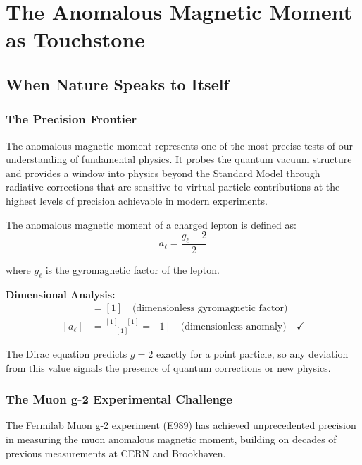\documentclass[12pt,a4paper]{report}
\begin{document}
\chapter{The Anomalous Magnetic Moment as Touchstone}
\label{chap:anomalous_magnetic_moment}

\section{When Nature Speaks to Itself}
\label{sec:nature_speaks}

\subsection{The Precision Frontier}
\label{subsec:precision_frontier}

The anomalous magnetic moment represents one of the most precise tests of our understanding of fundamental physics. It probes the quantum vacuum structure and provides a window into physics beyond the Standard Model through radiative corrections that are sensitive to virtual particle contributions at the highest levels of precision achievable in modern experiments.

The anomalous magnetic moment of a charged lepton is defined as:
\begin{equation}
	a_\ell = \frac{g_\ell - 2}{2}
	\label{eq:anomalous_moment_definition}
\end{equation}

where $g_\ell$ is the gyromagnetic factor of the lepton.

\textbf{Dimensional Analysis:}
\begin{align}
	[g_\ell] &= [1] \quad \text{(dimensionless gyromagnetic factor)} \\
	[a_\ell] &= \frac{[1] - [1]}{[1]} = [1] \quad \text{(dimensionless anomaly)} \quad \checkmark
\end{align}

The Dirac equation predicts $g = 2$ exactly for a point particle, so any deviation from this value signals the presence of quantum corrections or new physics.

\subsection{The Muon g-2 Experimental Challenge}
\label{subsec:muon_g2_challenge}

The Fermilab Muon g-2 experiment (E989) has achieved unprecedented precision in measuring the muon anomalous magnetic moment, building on decades of previous measurements at CERN and Brookhaven.
\end{document}
